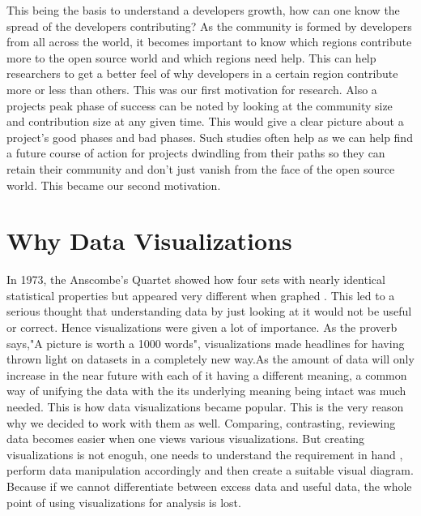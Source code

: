 \documentclass[seploa]{beavtex}
\begin{document}
This being the basis to understand a developers growth, how can one know the spread of the developers contributing? As the community is formed by developers from all across the world, it becomes important to know which regions contribute more to the open source world and which regions need help. This can help researchers to get a better feel of why developers in a certain region contribute more or less than others. This was our first motivation for research. Also a projects peak phase of success can be noted by looking at the community size and contribution size at any given time. This would give a clear picture about a project's good phases and bad phases. Such studies often help as we can help find a future course of action for projects dwindling from their paths so they can retain their community and don't just vanish from the face of the open source world. This became our second motivation.

\section{Why Data Visualizations}
In 1973, the Anscombe's Quartet showed how four sets with nearly identical statistical properties but appeared very different when graphed \cite{wiki}. This led to a serious thought that understanding data by just looking at it would not be useful or correct. Hence visualizations were given a lot of importance. As the proverb says,"A picture is worth a 1000 words", visualizations made headlines for having thrown light on datasets in a completely new way.As the amount of data will only increase in the near future with each of it having a different meaning, a common way of unifying the data with the its underlying meaning being intact was much needed. This is how data visualizations became popular. This is the very reason why we decided to work with them as well. Comparing, contrasting, reviewing data becomes easier when one views various visualizations. But creating visualizations is not enoguh, one needs to understand the requirement in hand , perform data manipulation accordingly and then create a suitable visual diagram. Because if we cannot differentiate between excess data and useful data, the whole point of using visualizations for analysis is lost.
\end{document}
